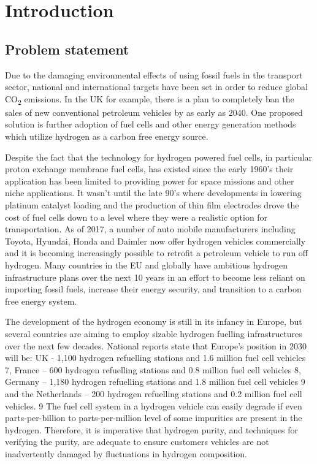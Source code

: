 \chapter{Introduction}
\section{Problem statement}
Due to the damaging environmental effects of using fossil fuels in the transport sector, national and international targets have been set in order to reduce global CO\textsubscript{2} emissions. In the UK for example, there is a plan to completely ban the sales of new conventional petroleum vehicles by as early as 2040. \cite{DepartmentforEnvironment2017} One proposed solution is further adoption of fuel cells and other energy generation methods which utilize hydrogen as a carbon free energy source. 

Despite the fact that the technology for hydrogen powered fuel cells, in particular proton exchange membrane fuel cells, has existed since the early 1960’s their application has been limited to providing power for space missions and other niche applications. It wasn’t until the late 90’s where developments in lowering platinum catalyst loading and the production of thin film electrodes drove the cost of fuel cells down to a level where they were a realistic option for transportation. As of 2017, a number of auto mobile manufacturers including Toyota,\cite{Toyota2015} Hyundai, \cite{Hyundai2015} Honda \cite{Honda} and Daimler \cite{Mohrdieck2014} now offer hydrogen vehicles commercially and it is becoming increasingly possible to retrofit a petroleum vehicle to run off hydrogen.\cite{FCell2016} Many countries in the EU and globally have ambitious hydrogen infrastructure plans over the next 10 years in an effort to become less reliant on importing fossil fuels, increase their energy security, and transition to a carbon free energy system.

The development of the hydrogen economy is still in its infancy in Europe, but several countries are aiming to employ sizable hydrogen fuelling infrastructures over the next few decades. National reports state that Europe’s position in 2030 will be: UK - 1,100 hydrogen refuelling stations and 1.6 million fuel cell vehicles 7, France – 600 hydrogen refuelling stations and 0.8 million fuel cell vehicles 8, Germany – 1,180 hydrogen refuelling stations and 1.8 million fuel cell vehicles 9 and the Netherlands – 200 hydrogen refuelling stations and 0.2 million fuel cell vehicles. 9 The fuel cell system in a hydrogen vehicle can easily degrade if even parts-per-billion to parts-per-million level of some impurities are present in the hydrogen. Therefore, it is imperative that hydrogen purity, and techniques for verifying the purity, are adequate to ensure customers vehicles are not inadvertently damaged by fluctuations in hydrogen composition. 

